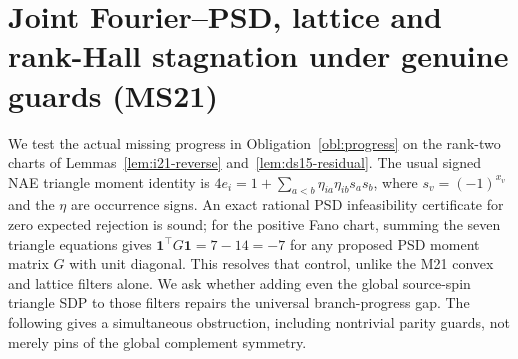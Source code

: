 \documentclass[11pt]{article}
\begin{document}
\section{Joint Fourier--PSD, lattice and rank-Hall stagnation under genuine guards (MS21)}\label{sec:ms21}
We test the actual missing progress in Obligation~\ref{obl:progress} on the rank-two charts of Lemmas~\ref{lem:i21-reverse} and~\ref{lem:ds15-residual}. The usual signed NAE triangle moment identity is $4e_i=1+\sum_{a<b}\eta_{ia}\eta_{ib}s_as_b$, where $s_v=(-1)^{x_v}$ and the $\eta$ are occurrence signs. An exact rational PSD infeasibility certificate for zero expected rejection is sound; for the positive Fano chart, summing the seven triangle equations gives $\mathbf 1^\top G\mathbf 1=7-14=-7$ for any proposed PSD moment matrix $G$ with unit diagonal. This resolves that control, unlike the M21 convex and lattice filters alone. We ask whether adding even the global source-spin triangle SDP to those filters repairs the universal branch-progress gap. The following gives a simultaneous obstruction, including nontrivial parity guards, not merely pins of the global complement symmetry.
\end{document}
